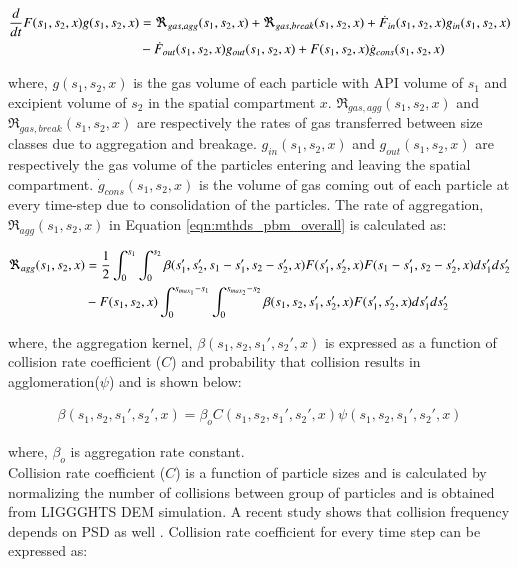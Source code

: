 \documentclass[preprint,11pt,authoryear]{elsarticle}
\begin{document}
\begin{align}
\frac{d}{dt}F(s_1,s_2,x)g(s_1,s_2,x)&= 
\Re_{gas,agg}(s_1,s_2,x)+\Re_{gas,break}(s_1,s_2,x)+\dot{F}_{in}(s_1,s_2,x)g_{in}(s_1,s_2,x)\notag\\
&-\dot{F}_{out}(s_1,s_2,x)g_{out}(s_1,s_2,x)+F(s_1,s_2,x)\dot{g}_{cons}(s_1,s_2,x)
\label{eqn:mthds_pbm_gas_agg} 
\end{align}

where, $g(s_1,s_2,x)$ is the gas volume of each particle with API volume of $s_1$ and excipient 
volume of $s_2$ in the spatial compartment $x$. $\Re_{gas,agg}(s_1,s_2,x)$ and 
$\Re_{gas,break}(s_1,s_2,x)$ are respectively the rates of gas transferred between size classes due to 
aggregation and breakage. $g_{in}(s_1,s_2,x)$ and $g_{out}(s_1,s_2,x)$ are respectively the gas 
volume of the particles entering and leaving the spatial compartment. $\dot{g}_{cons}(s_1,s_2,x)$ is the 
volume of gas coming out of each particle at every time-step due to consolidation of the particles. 
The rate of aggregation, $\Re_{agg}(s_1,s_2,x)$ in Equation \ref{eqn:mthds_pbm_overall} is 
calculated as: \citep{Chaturbedi2017}

\begin{align}
\Re_{agg}(s_1,s_2,x)&= \frac{1}{2}\int _0^{s_1} \int_0^{s_2} 
\beta(s_1',s_2',s_1-s_1',s_2-s_2',x)F(s_1',s_2',x)F(s_1-s_1',s_2-s_2',x)ds_1'ds_2'\notag\\ 
&- F(s_1,s_2,x)\int _0^{s_{max_1}-s_1} \int_0^{s_{max_2}-s_2} 
\beta(s_1,s_2,s_1',s_2',x)F(s_1',s_2',x)ds_1'ds_2'
\end{align}


where, the aggregation kernel, $\beta(s_1,s_2, s_1',s_2',x)$ is expressed as a function of collision 
rate coefficient ($C$) and probability that collision results in agglomeration($\psi$) \citep{ingram2005}
and is shown below: 

\begin{align}
\beta(s_1,s_2,s_1',s_2',x) = \beta_oC(s_1,s_2,s_1',s_2',x)\psi(s_1,s_2,s_1',s_2',x)
\label{eqn:mthds_pbm_beta_kernal}
\end{align}

where, $\beta_o$ is aggregation rate constant.\\
Collision rate coefficient ($C$) is a function of particle sizes and is calculated by normalizing the 
number of collisions between group of particles \citep{gantt2006} and is obtained from LIGGGHTS 
DEM simulation. A recent study shows that collision frequency depends on PSD as well 
\citep{sen2014}. Collision rate coefficient for every time step can be expressed as:
\end{document}
